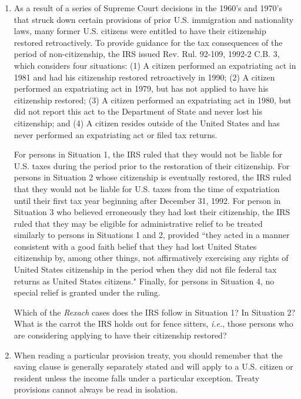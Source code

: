 \begin{enumerate}
	\item
As a result of a series of Supreme Court decisions in the 1960's and 1970's that struck down certain provisions of prior U.S. immigration and nationality laws, many former U.S. citizens were entitled to have their citizenship restored retroactively.  To provide guidance for the tax consequences of the period of non-citizenship, the IRS issued Rev. Rul. 92-109, 1992-2 C.B. 3, which considers four situations: (1) A citizen performed an expatriating act in 1981 and had his citizenship restored retroactively in 1990; (2) A citizen performed an expatriating act in 1979, but has not applied to have his citizenship restored; (3) A citizen performed an expatriating act in 1980, but did not report this act to the Department of State and never lost his citizenship; and (4) A citizen resides outside of the United States and has never performed an expatriating act or filed tax returns.     

For persons in Situation 1, the IRS ruled that they would not be liable for U.S. taxes during the period prior to the restoration of their citizenship.  For persons in Situation 2 whose citizenship is eventually restored, the IRS ruled that they would not be liable for U.S. taxes from the time of expatriation until their first tax year beginning after December 31, 1992.  For person in Situation 3 who believed erroneously they had lost their citizenship, the IRS ruled that they may be eligible for administrative relief to be treated similarly to persons in Situations 1 and 2, provided ``they acted in a manner consistent with a good faith belief that they had lost United States citizenship by, among other things, not affirmatively exercising any rights of United States citizenship in the period when they did not file federal tax returns as United States citizens."  Finally, for persons in Situation 4, no special relief is granted under the ruling.  

Which of the \textit{Rexach} cases does the IRS follow in Situation 1?  In Situation 2?  What is the carrot the IRS holds out for fence sitters, \emph{i.e.}, those persons who are considering applying to have their citizenship restored?

	\item 
	When reading a particular provision treaty, you should remember that the saving clause is generally separately stated and will apply to a U.S. citizen or resident unless the income falls under a particular exception. Treaty provisions cannot always be read in isolation.  
	

\end{enumerate}

